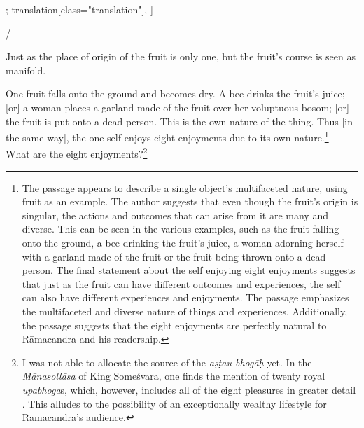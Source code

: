 \begin{alignment}[
  texts=edition[class="edition"];
  translation[class="translation"],
  ]
\begin{edition}
\begin{tlg}[22_1]
{{}/}\\
\end{tlg}
  \end{edition}
  \begin{translation}
    \begin{tlate}[p22_03]
      Just as the place of origin of the fruit is only one, but the fruit's course is seen as manifold.
      
      One fruit falls onto the ground and becomes dry. A bee drinks the fruit's juice; 
      [or] a woman places a garland made of the fruit over her voluptuous bosom; 
      [or] the fruit is put onto a dead person. This is the own nature of the thing. 
      Thus [in the same way], the one self enjoys eight enjoyments due to its own nature.\footnote{The passage appears to describe a single object's multifaceted nature, using fruit as an example. 
      The author suggests that even though the fruit's origin is singular, the actions and outcomes that can arise from it are many and diverse. 
      This can be seen in the various examples, such as the fruit falling onto the ground, a bee drinking the fruit's juice, 
      a woman adorning herself with a garland made of the fruit or the fruit being thrown onto a dead person. 
      The final statement about the self enjoying eight enjoyments suggests that just as the fruit can have different outcomes and experiences, 
      the self can also have different experiences and enjoyments. The passage emphasizes the multifaceted and diverse nature of things and experiences.
       Additionally, the passage suggests that the eight enjoyments are perfectly natural to Rāmacandra and his readership.}
      \\
      What are the eight enjoyments?\footnote{I was not able to allocate the source of the \textit{aṣṭau bhogāḥ} yet.
       In the \textit{Mānasollāsa} of King Someśvara, one finds the mention of twenty royal \textit{upabhoga}s, which, however,
      includes all of the eight pleasures in greater detail \parencite[5]{manasollasa}. 
      This alludes to the possibility of an exceptionally wealthy lifestyle for Rāmacandra's audience.}
      \end{tlate}
    \begin{tlate}[22_1]

\end{tlate}
\end{translation}
\end{alignment}
